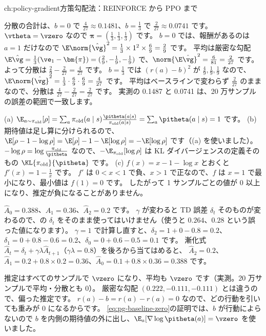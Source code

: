 \begin{answers}{ch:policy-gradient}{方策勾配法：REINFORCE から PPO まで}
\item 分散の合計は、$b=0$ で $\frac{4}{27}\approx0.1481$、$b=\frac13$ で $\frac{2}{27}\approx0.0741$ です。
$\vtheta=\vzero$ なので $\bm{\pi}=(\frac13,\frac13,\frac13)$ です。
$b=0$ では、報酬があるのは $a=1$ だけなので $\E\norm{\hat{\vg}}^2=\frac13\times1^2\times\frac69=\frac29$ です。
平均は厳密な勾配 $\E\hat{\vg}=\frac13(\ve_1-\bm{\pi})=(\frac29,-\frac19,-\frac19)$ で、$\norm{\E\hat{\vg}}^2=\frac{6}{81}=\frac{2}{27}$ です。
よって分散は $\frac29-\frac{2}{27}=\frac{4}{27}$ です。
$b=\frac13$ では $(r(a)-b)^2$ が $\frac49,\frac19,\frac19$ なので、$\E\norm{\hat{\vg}}^2=\frac13\cdot\frac69\cdot\frac69=\frac{4}{27}$ です。
平均はベースラインで変わらず $\frac{2}{27}$ のままなので、分散は $\frac{4}{27}-\frac{2}{27}=\frac{2}{27}$ です。
実測の 0.1487 と 0.0741 は、20 万サンプルの誤差の範囲で一致します。
\item (a) $\E_{a\sim\pi_{\text{old}}}[\rho]=\sum_a\pi_{\text{old}}(a\mid s)\frac{\pitheta(a\mid s)}{\pi_{\text{old}}(a\mid s)}=\sum_a\pitheta(a\mid s)=1$ です。
(b) 期待値は足し算に分けられるので、$\E[\rho-1-\log\rho]=\E[\rho]-1-\E[\log\rho]=-\E[\log\rho]$ です（(a) を使いました）。
$-\log\rho=\log\frac{\pi_{\text{old}}}{\pitheta}$ なので、$-\E_{\pi_{\text{old}}}[\log\rho]$ は KL ダイバージェンスの定義そのもの $\KL{\pi_{\text{old}}}{\pitheta}$ です。
(c) $f(x)=x-1-\log x$ とおくと $f'(x)=1-\frac1x$ です。
$f'$ は $0<x<1$ で負、$x>1$ で正なので、$f$ は $x=1$ で最小になり、最小値は $f(1)=0$ です。
したがって 1 サンプルごとの値が 0 以上になり、推定が負になることがありません。
\item $\hat{A}_0=0.388$、$\hat{A}_1=0.36$、$\hat{A}_2=0.2$ です。
$\gamma$ が変わると TD 誤差 $\delta_t$ そのものが変わるので、の $\delta_t$ をそのまま使ってはいけません（使うと $0.264$、$0.28$ という誤った値になります）。
$\gamma=1$ で計算し直すと、$\delta_2=1+0-0.8=0.2$、$\delta_1=0+0.8-0.6=0.2$、$\delta_0=0+0.6-0.5=0.1$ です。
漸化式 $\hat{A}_t=\delta_t+\gamma\lambda\hat{A}_{t+1}$（$\gamma\lambda=0.8$）を後ろから当てはめると、
$\hat{A}_2=0.2$、$\hat{A}_1=0.2+0.8\times0.2=0.36$、$\hat{A}_0=0.1+0.8\times0.36=0.388$ です。
\item 推定はすべてのサンプルで $\vzero$ になり、平均も $\vzero$ です（実測。20 万サンプルで平均・分散とも 0）。
厳密な勾配 $(0.222,-0.111,-0.111)$ とは違うので、偏った推定です。
$r(a)-b=r(a)-r(a)=0$ なので、どの行動を引いても重みが 0 になるからです。
\eqref{eq:pg-baseline-zero}の証明では、$b$ が行動によらないので $b$ を内側の期待値の外に出し、$\E_a[\nabla\log\pitheta(a)]=\vzero$ を使いました。

\end{answers}
